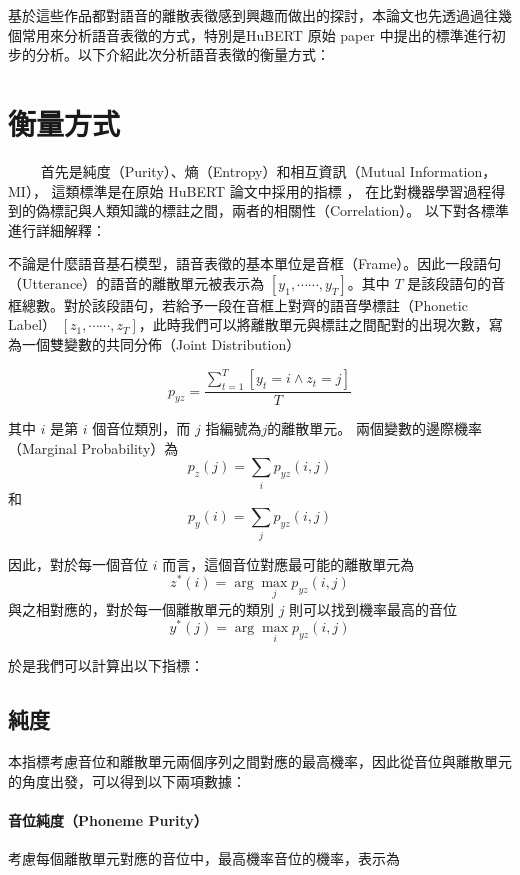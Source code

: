 基於這些作品都對語音的離散表徵感到興趣而做出的探討，本論文也先透過過往幾個常用來分析語音表徵的方式，特別是HuBERT 原始 paper 中提出的標準進行初步的分析。以下介紹此次分析語音表徵的衡量方式：

\section{衡量方式}

　　
首先是純度（Purity）、熵（Entropy）和相互資訊（Mutual Information，MI），
這類標準是在原始 HuBERT 論文中採用的指標 \cite{hsu_hubert_2021, hsu_hubert_2021-2}，
在比對機器學習過程得到的偽標記與人類知識的標註之間，兩者的相關性（Correlation）。
以下對各標準進行詳細解釋：


不論是什麼語音基石模型，語音表徵的基本單位是音框（Frame）。因此一段語句（Utterance）的語音的離散單元被表示為 $[y_1, \cdots\cdots, y_T]$。其中 $T$ 是該段語句的音框總數。對於該段語句，若給予一段在音框上對齊的語音學標註（Phonetic Label）
$[z_1, \cdots\cdots, z_T]$，此時我們可以將離散單元與標註之間配對的出現次數，寫為一個雙變數的共同分佈（Joint Distribution）

$$
p_{yz} = 
\frac{
\sum^T_{t=1}
[
{y_t = i 
\wedge
z_t = j}
]
}
{T}$$

其中 $i$ 是第 $i$ 個音位類別，而 $j$ 指編號為$j$的離散單元。
兩個變數的邊際機率（Marginal Probability）為
$$p_z(j)=\sum_i{p_{yz}(i, j)}$$
和
$$p_y(i)=\sum_j{p_{yz}(i, j)}$$

因此，對於每一個音位 $i$ 而言，這個音位對應最可能的離散單元為
 $$z^\ast(i) = \arg\max_j p_{yz}(i, j)$$
與之相對應的，對於每一個離散單元的類別 $j$ 則可以找到機率最高的音位
$$y^\ast(j) = \arg\max_i p_{yz}(i,j)$$

於是我們可以計算出以下指標：

\subsection{純度}

本指標考慮音位和離散單元兩個序列之間對應的最高機率，因此從音位與離散單元的角度出發，可以得到以下兩項數據：


\paragraph{音位純度（Phoneme Purity）}
考慮每個離散單元對應的音位中，最高機率音位的機率，表示為


